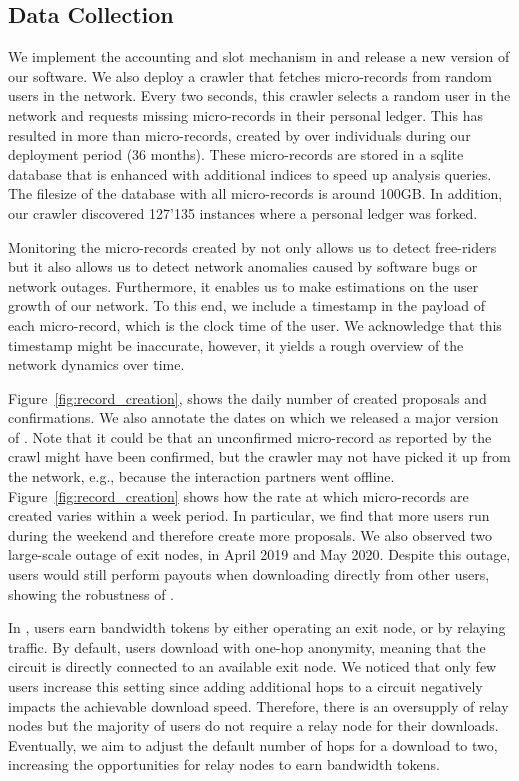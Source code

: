 \subsection{Data Collection}
We implement the accounting and slot mechanism in \Tribler{} and release a new version of our software.
We also deploy a crawler that fetches \ModelName{} micro-records from random users in the \Tribler{} network.
Every two seconds, this crawler selects a random user in the network and requests missing micro-records in their personal ledger.
This has resulted in more than \TrialRecords{} micro-records, created by over \TrialUsers{} individuals during our deployment period (36 months).
These micro-records are stored in a sqlite database that is enhanced with additional indices to speed up analysis queries.
The filesize of the database with all micro-records is around 100GB.
In addition, our crawler discovered 127'135 instances where a personal ledger was forked.

Monitoring the micro-records created by \ModelName{} not only allows us to detect free-riders but it also allows us to detect network anomalies caused by software bugs or network outages.
Furthermore, it enables us to make estimations on the user growth of our network.
To this end, we include a timestamp in the payload of each micro-record, which is the clock time of the user.
We acknowledge that this timestamp might be inaccurate, however, it yields a rough overview of the network dynamics over time.

Figure~\ref{fig:record_creation}, shows the daily number of created proposals and confirmations.
We also annotate the dates on which we released a major version of \Tribler{}.
Note that it could be that an unconfirmed micro-record as reported by the crawl might have been confirmed, but the crawler may not have picked it up from the network, e.g., because the interaction partners went offline.
Figure~\ref{fig:record_creation} shows how the rate at which micro-records are created varies within a week period.
In particular, we find that more users run \Tribler{} during the weekend and therefore create more proposals.
We also observed two large-scale outage of exit nodes, in April 2019 and May 2020.
Despite this outage, users would still perform payouts when downloading directly from other \Tribler{} users, showing the robustness of \ModelName{}.

In \Tribler{}, users earn bandwidth tokens by either operating an exit node, or by relaying traffic.
By default, users download with one-hop anonymity, meaning that the circuit is directly connected to an available exit node.
We noticed that only few users increase this setting since adding additional hops to a circuit negatively impacts the achievable download speed.
Therefore, there is an oversupply of relay nodes but the majority of users do not require a relay node for their downloads.
Eventually, we aim to adjust the default number of hops for a download to two, increasing the opportunities for relay nodes to earn bandwidth tokens.

